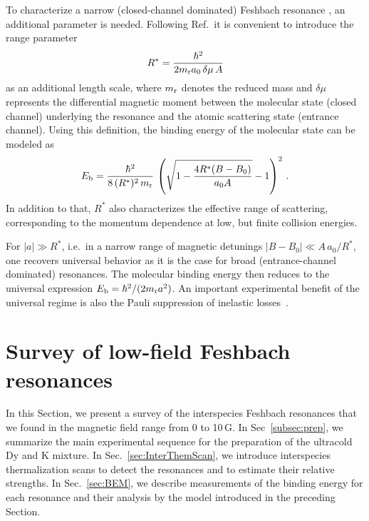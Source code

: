 To characterize a narrow (closed-channel dominated) Feshbach resonance \cite{Chin2010fri}, an additional parameter is needed. Following Ref.\,\cite{Petrov2004tbp} it is convenient to introduce the range parameter 
\begin{equation}
	\label{equ:Rstar}
	R^* = \frac{\hbar^2}{2 m_{\textrm r} a_0 \, \delta \mu \, A}
\end{equation}
as an additional length scale, where $m_{\textrm r}$ denotes the reduced mass and $\delta \mu$ represents the differential magnetic moment between the molecular state (closed channel) underlying the resonance and the atomic scattering state (entrance channel). Using this definition, the binding energy of the molecular state can be modeled as~\cite{Petrov2004tbp,Lous2018pti}
\begin{equation} 
	\label{equ:bindingEnergyCurve}
	E_{\textrm b} = \frac{\hbar^2}{8 \, (R^*)^2 \, m_{\textrm r}} \, \left( \sqrt{1- \frac{4 R^* (B-B_0)}{a_0 A}} -1 \right)^2 \, .
\end{equation}
In addition to that, $R^*$ also characterizes the effective range of scattering, corresponding to the momentum dependence at low, but finite collision energies.

For $|a| \gg R^*$, i.e.\ in a narrow range of magnetic detunings $|B-B_0| \ll A\,a_0/R^*$, one recovers universal behavior as it is the case for broad (entrance-channel dominated) resonances. The molecular binding energy then reduces to the universal expression $E_{\textrm b} = \hbar^2/(2 m_{\textrm r} a^2)$. An important experimental benefit of the universal regime is also the Pauli suppression of inelastic losses~\cite{Petrov2004wbd,Petrov2005dmi,Jag2016lof}.

\section{\label{sec:servey}Survey of low-field Feshbach resonances}

In this Section, we present a survey of the interspecies Feshbach resonances that we found in the magnetic field range from 0 to 10\,G. In Sec~\ref{subsec:prep}, we summarize the main experimental sequence for the preparation of the ultracold Dy and K mixture. In Sec.~\ref{sec:InterThemScan}, we introduce interspecies thermalization scans to detect the resonances and to estimate their relative strengths. In Sec.~\ref{sec:BEM}, we describe measurements of the binding energy for each resonance and their analysis by the model introduced in the preceding Section.

